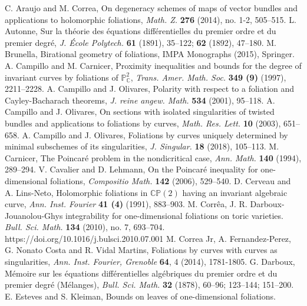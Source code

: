 \documentclass{amsart} %
\theoremstyle{definition}
\begin{document}
\begin{thebibliography}{99}
 C. Araujo and M. Correa,
   On degeneracy schemes of maps of vector bundles and applications
   to holomorphic foliations,
   {\it Math. Z.} \textbf{276} (2014), no. 1-2, 505–515.
 L. Autonne,
   Sur la th\'eorie des \'equations diff\'erentielles du premier ordre et du premier degr\'e,
   {\it J. \'Ecole Polytech.} {\bf 61} (1891), 35--122; {\bf 62} (1892), 47--180.
 M. Brunella,
   Birational geometry of foliations, IMPA Monographs (2015), Springer.
 A. Campillo and M. Carnicer,
   Proximity inequalities and bounds for the degree of invariant curves by foliations
   of $\mathbb{P}_{\mathbb{C}}^2$, {\em Trans. Amer. Math. Soc.} {\bf 349 (9)} (1997), 2211--2228.
 A. Campillo and J. Olivares,
   Polarity with respect to a foliation and Cayley-Bacharach theorems,
   \textit{J. reine angew. Math.} \textbf{534} (2001), 95--118.
 A. Campillo and J. Olivares,
   On sections with isolated singularities of twisted bundles and applications to foliations by curves,
   \textit{Math. Res. Lett.} \textbf{10} (2003), 651--658.
 A. Campillo and J. Olivares,
   Foliations by curves uniquely determined by minimal subschemes of its singularities,
   \textit{J. Singular.} \textbf{18} (2018), 105--113.
 M. Carnicer, The Poincar\'{e} problem in the nondicritical case,
   {\it Ann. Math.} {\bf 140} (1994), 289--294.
 V. Cavalier and D. Lehmann,
   On the Poincar\'e inequality for one-dimensional foliations,
   {\it Compositio Math.} {\bf 142} (2006), 529--540.
 D. Cerveau and A. Lins-Neto,
   Holomorphic foliations in $\mathbb{C} \mathbb{P}(2)$ having an invariant algebraic curve,
   {\it Ann. Inst. Fourier} {\bf 41 (4)} (1991), 883--903.
  M. Corrêa, J. R.
   Darboux-Jouanolou-Ghys integrability for one-dimensional foliations on toric varieties.
   \textit{Bull. Sci. Math.} \textbf{134} (2010), no. 7, 693–704.
    https://doi.org/10.1016/j.bulsci.2010.07.001
   M. Correa Jr, A. Fernandez-Perez, G. Nonato Costa and R. Vidal Martins,
   Foliations by curves with curves as singularities,
   {\it Ann. Inst. Fourier, Grenoble}
   \textbf{64}, 4 (2014),  1781-1805.
 G. Darboux, M\'emoire sur les \'equations diff\'erentielles alg\'ebriques du premier
   ordre et du premier degr\'e (M\'elanges),
   {\it Bull. Sci. Math.} {\bf 32} (1878), 60--96; 123--144; 151--200.
 E. Esteves  and S. Kleiman,
    Bounds on leaves of one-dimensional foliations.

\end{thebibliography}
\end{document}
